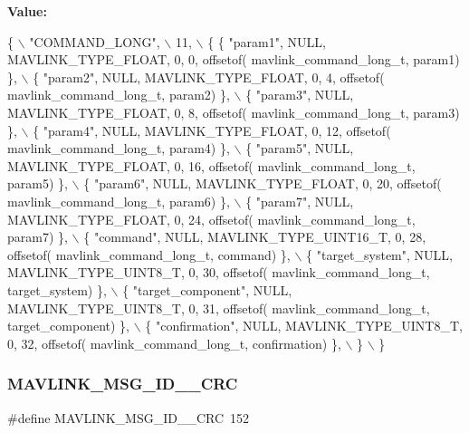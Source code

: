 {\bfseries Value\+:}
\begin{DoxyCode}
\{ \(\backslash\)
    \textcolor{stringliteral}{"COMMAND\_LONG"}, \(\backslash\)
    11, \(\backslash\)
    \{  \{ \textcolor{stringliteral}{"param1"}, NULL, MAVLINK_TYPE_FLOAT, 0, 0, offsetof(
      mavlink_command_long_t, param1) \}, \(\backslash\)
         \{ \textcolor{stringliteral}{"param2"}, NULL, MAVLINK_TYPE_FLOAT, 0, 4, offsetof(
      mavlink_command_long_t, param2) \}, \(\backslash\)
         \{ \textcolor{stringliteral}{"param3"}, NULL, MAVLINK_TYPE_FLOAT, 0, 8, offsetof(
      mavlink_command_long_t, param3) \}, \(\backslash\)
         \{ \textcolor{stringliteral}{"param4"}, NULL, MAVLINK_TYPE_FLOAT, 0, 12, offsetof(
      mavlink_command_long_t, param4) \}, \(\backslash\)
         \{ \textcolor{stringliteral}{"param5"}, NULL, MAVLINK_TYPE_FLOAT, 0, 16, offsetof(
      mavlink_command_long_t, param5) \}, \(\backslash\)
         \{ \textcolor{stringliteral}{"param6"}, NULL, MAVLINK_TYPE_FLOAT, 0, 20, offsetof(
      mavlink_command_long_t, param6) \}, \(\backslash\)
         \{ \textcolor{stringliteral}{"param7"}, NULL, MAVLINK_TYPE_FLOAT, 0, 24, offsetof(
      mavlink_command_long_t, param7) \}, \(\backslash\)
         \{ \textcolor{stringliteral}{"command"}, NULL, MAVLINK_TYPE_UINT16_T, 0, 28, offsetof(
      mavlink_command_long_t, command) \}, \(\backslash\)
         \{ \textcolor{stringliteral}{"target\_system"}, NULL, MAVLINK_TYPE_UINT8_T, 0, 30, offsetof(
      mavlink_command_long_t, target\_system) \}, \(\backslash\)
         \{ \textcolor{stringliteral}{"target\_component"}, NULL, MAVLINK_TYPE_UINT8_T, 0, 31, offsetof(
      mavlink_command_long_t, target\_component) \}, \(\backslash\)
         \{ \textcolor{stringliteral}{"confirmation"}, NULL, MAVLINK_TYPE_UINT8_T, 0, 32, offsetof(
      mavlink_command_long_t, confirmation) \}, \(\backslash\)
         \} \(\backslash\)
\}
\end{DoxyCode}
\mbox{\label{mavlink__msg__command__long_8h_a0a31a309dc26e573657203c4a481e1a2}} 
\subsubsection{M\+A\+V\+L\+I\+N\+K\+\_\+\+M\+S\+G\+\_\+\+I\+D\+\_\+\_\+\+C\+RC}
{\footnotesize\ttfamily \#define M\+A\+V\+L\+I\+N\+K\+\_\+\+M\+S\+G\+\_\+\+I\+D\+\_\+\_\+\+C\+RC~152}

